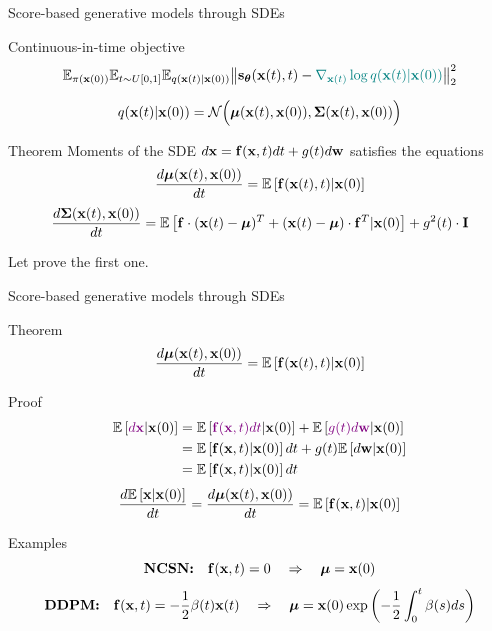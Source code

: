 \begin{frame}{Score-based generative models through SDEs}
	\vspace{-0.3cm}
	\begin{block}{Continuous-in-time objective}
		\vspace{-0.5cm}
		\[
			\mathbb{E}_{\pi(\mathbf{x}(0))} \mathbb{E}_{t \sim U[0, 1]} \mathbb{E}_{q(\mathbf{x}(t) | \mathbf{x}(0))}\bigl\| \mathbf{s}_{\boldsymbol{\theta}}(\mathbf{x}(t), t) - {\color{teal}\nabla_{\mathbf{x}(t)} \log q(\mathbf{x}(t) | \mathbf{x}(0))} \bigr\|^2_2 
		\]
		\vspace{-0.7cm}
	\end{block}
	\[
		q(\mathbf{x}(t) | \mathbf{x}(0)) = \mathcal{N}\Bigl(\boldsymbol{\mu}(\mathbf{x}(t), \mathbf{x}(0)), \boldsymbol{\Sigma}(\mathbf{x}(t), \mathbf{x}(0))\Bigr)
	\]
	\vspace{-0.5cm}
	\begin{block}{Theorem}
		Moments of the SDE $d\mathbf{x} = \mathbf{f}(\mathbf{x}, t) dt + g(t) d \mathbf{w}$ satisfies the equations
		\[
			\frac{d \boldsymbol{\mu}(\mathbf{x}(t), \mathbf{x}(0))}{dt} = \mathbb{E} \left[ \mathbf{f}(\mathbf{x}(t), t) | \mathbf{x}(0)\right]
		\]
		\[
			\frac{d \boldsymbol{\Sigma}(\mathbf{x}(t), \mathbf{x}(0))}{dt} = \mathbb{E} \left[ \mathbf{f} \cdot (\mathbf{x}(t) - \boldsymbol{\mu})^T + (\mathbf{x}(t) - \boldsymbol{\mu}) \cdot \mathbf{f}^T | \mathbf{x}(0)\right] + g^2(t) \cdot \mathbf{I}
		\]
	\end{block}
	Let prove the first one.
\end{frame}
\begin{frame}{Score-based generative models through SDEs}
	\begin{block}{Theorem}
		\vspace{-0.3cm}
		\[
			\frac{d \boldsymbol{\mu}(\mathbf{x}(t), \mathbf{x}(0))}{dt} = \mathbb{E} \left[ \mathbf{f}(\mathbf{x}(t), t) | \mathbf{x}(0)\right]
		\]
		\vspace{-0.5cm}
	\end{block}
	\begin{block}{Proof}
		\vspace{-0.7cm}
		\begin{align*}
			\mathbb{E}\left[{\color{violet}d\mathbf{x}} | \mathbf{x}(0) \right] &= \mathbb{E}\left[{\color{violet}\mathbf{f}(\mathbf{x}, t) dt} | \mathbf{x}(0) \right] + \mathbb{E}\left[{\color{violet}g(t) d \mathbf{w}} | \mathbf{x}(0) \right] \\
			&= \mathbb{E}\left[\mathbf{f}(\mathbf{x}, t) | \mathbf{x}(0) \right] dt + g(t) \mathbb{E}\left[d \mathbf{w} | \mathbf{x}(0) \right] \\
			&= \mathbb{E}\left[\mathbf{f}(\mathbf{x}, t) | \mathbf{x}(0) \right] dt
		\end{align*}
		\[
			\frac{d \mathbb{E}\left[\mathbf{x} | \mathbf{x}(0) \right]}{dt} = \frac{d \boldsymbol{\mu}(\mathbf{x}(t), \mathbf{x}(0))}{dt} = \mathbb{E}\left[\mathbf{f}(\mathbf{x}, t) | \mathbf{x}(0) \right] 
		\]
	\end{block}
	\vspace{-0.3cm}
	\begin{block}{Examples}
		\vspace{-0.5cm}
		\[
			\textbf{NCSN:} \quad	\mathbf{f}(\mathbf{x}, t) = 0 \quad \Rightarrow \quad \boldsymbol{\mu} = \mathbf{x}(0)
		\]
		\[
			\textbf{DDPM:} \quad \mathbf{f}(\mathbf{x}, t) = - \frac{1}{2} \beta(t) \mathbf{x}(t) \quad \Rightarrow \quad \boldsymbol{\mu} = \mathbf{x}(0) \exp\left(- \frac{1}{2} \int_0^t \beta(s)ds\right)
		\]
	\end{block}
\end{frame}
